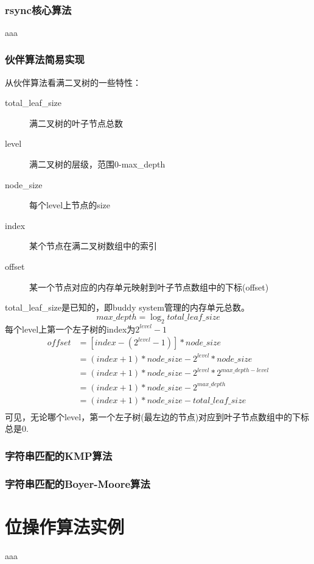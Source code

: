 ﻿\documentclass[a4paper,11pt]{article}
\begin{document}
  \tt %
  \pagestyle{header}
  \sybmaketitle
  \tableofcontents
  \newpage

  \pagestyle{main}
  \setcounter{page}{1}

  \section[rsync核心算法]{rsync核心算法}
  aaa

  \section[伙伴算法简易实现]{伙伴算法简易实现}
  从伙伴算法看满二叉树的一些特性：
  \begin{description}
    \item[total\_leaf\_size] 满二叉树的叶子节点总数
    \item[level] 满二叉树的层级，范围0-max\_depth
    \item[node\_size] 每个level上节点的size
    \item[index] 某个节点在满二叉树数组中的索引
    \item[offset] 某一个节点对应的内存单元映射到叶子节点数组中的下标(offset)
  \end{description}
  total\_leaf\_size是已知的，即buddy system管理的内存单元总数。
  $$ max\_depth = \log_2total\_leaf\_size$$
  每个level上第一个左子树的index为$2^{level} - 1$
  \begin{align*}
    offset & = [index - (2^{level} - 1)] * node\_size \\
           & = (index + 1) * node\_size - 2^{level} * node\_size \\
           & = (index + 1) * node\_size - 2^{level} * 2^{max\_depth - level} \\
           & = (index + 1) * node\_size - 2^{max\_depth} \\
           & = (index + 1) * node\_size - total\_leaf\_size \\
  \end{align*}
  可见，无论哪个level，第一个左子树(最左边的节点)对应到叶子节点数组中的下标总是0.
  
  \section[字符串匹配的KMP算法]{字符串匹配的KMP算法}

  \section[字符串匹配的Boyer-Moore算法]{字符串匹配的Boyer-Moore算法}

  \part[位操作算法实例]{位操作算法实例}
  aaa
\end{document}
